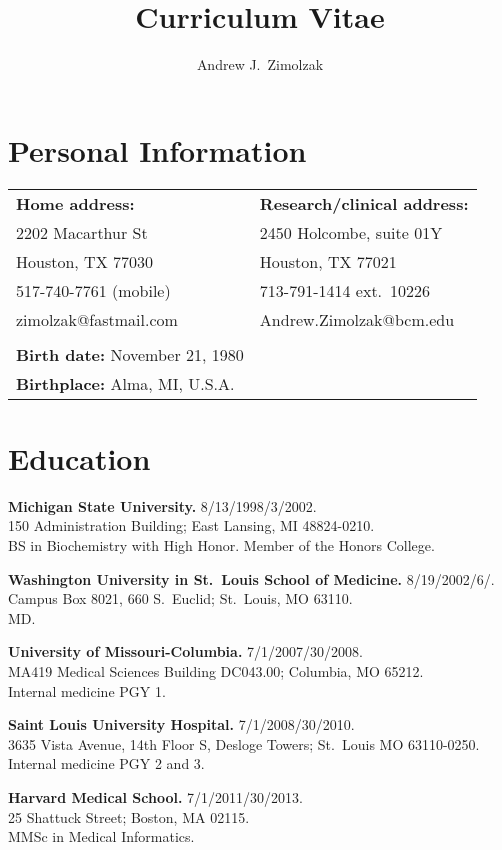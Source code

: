 \documentclass[10pt]{article}
\title{Curriculum Vitae}
\author{Andrew J.\ Zimolzak}
\begin{document}
\thispagestyle{fancy}

\section*{Personal Information}

\begin{tabular}{l l}
\textbf{Home address:}  & \textbf{Research/clinical address:}\\
2202 Macarthur St       & 2450 Holcombe, suite 01Y\\
Houston, TX 77030       & Houston, TX 77021\\
517-740-7761 (mobile)   & 713-791-1414 ext.\ 10226\\
zimolzak@fastmail.com   & Andrew.Zimolzak@bcm.edu\\
\\
\textbf{Birth date:} November 21, 1980\\
\textbf{Birthplace:} Alma, MI, U.S.A.
\end{tabular}

\section*{Education}

\textbf{Michigan State University.} 8/13/1998/3/2002.\\
150 Administration Building; East Lansing, MI 48824-0210.\\
BS in Biochemistry with High Honor. Member of the Honors College.

\textbf{Washington University in St.\ Louis School of Medicine.}
8/19/2002\ndash{}/6/.\\
Campus Box 8021, 660 S.\ Euclid; St.\ Louis, MO 63110.\\
MD.

\textbf{University of Missouri-Columbia.} 7/1/2007/30/2008.\\
MA419 Medical Sciences Building DC043.00; Columbia, MO 65212.\\
Internal medicine PGY 1.

\textbf{Saint Louis University Hospital.} 7/1/2008/30/2010.\\
3635 Vista Avenue, 14th Floor S, Desloge Towers; St.\ Louis MO
63110-0250.\\
Internal medicine PGY 2 and 3.

\textbf{Harvard Medical School.} 7/1/2011/30/2013.\\
25 Shattuck Street; Boston, MA 02115.\\
MMSc in Medical Informatics.
\end{document}
